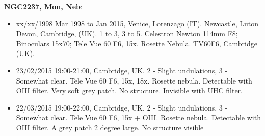 {\bf NGC2237, Mon, Neb}:
\begin{itemize}
\item xx/xx/1998 Mar 1998 to Jan 2015, Venice, Lorenzago (IT). Newcastle, Luton Devon, Cambridge, (UK). 1 to 3, 3 to 5. Celestron Newton 114mm F8; Binoculars 15x70; Tele Vue 60 F6, 15x. Rosette Nebula. TV60F6, Cambridge (UK).
\item 23/02/2015 19:00-21:00, Cambridge, UK. 2 - Slight undulations, 3 - Somewhat clear. Tele Vue 60 F6, 15x, 18x. Rosette nebula. Detectable with OIII filter. Very soft grey patch. No structure. Invisible with UHC filter.
\item 22/03/2015 19:00-22:00, Cambridge, UK. 2 - Slight undulations, 3 - Somewhat clear. Tele Vue 60 F6, 15x + OIII. Rosette nebula. Detectable with OIII filter. A grey patch 2 degree large. No structure visible
\end{itemize}
